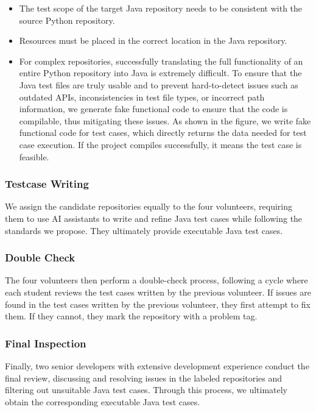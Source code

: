 \begin{itemize}[left=10pt]
    \item The test scope of the target Java repository needs to be consistent with the source Python repository.
    \item Resources must be placed in the correct location in the Java repository.
    \item For complex repositories, successfully translating the full functionality of an entire Python repository into Java is extremely difficult. To ensure that the Java test files are truly usable and to prevent hard-to-detect issues such as outdated APIs, inconsistencies in test file types, or incorrect path information, we generate fake functional code to ensure that the code is compilable, thus mitigating these issues. As shown in the figure, we write fake functional code for test cases, which directly returns the data needed for test case execution. If the project compiles successfully, it means the test case is feasible.
\end{itemize}

\subsubsection{Testcase Writing}
We assign the candidate repositories equally to the four volunteers, requiring them to use AI assistants to write and refine Java test cases while following the standards we propose. They ultimately provide executable Java test cases.

\subsubsection{Double Check}
The four volunteers then perform a double-check process, following a cycle where each student reviews the test cases written by the previous volunteer. If issues are found in the test cases written by the previous volunteer, they first attempt to fix them. If they cannot, they mark the repository with a problem tag.

\subsubsection{Final Inspection}
Finally, two senior developers with extensive development experience conduct the final review, discussing and resolving issues in the labeled repositories and filtering out unsuitable Java test cases. Through this process, we ultimately obtain the corresponding executable Java test cases.


